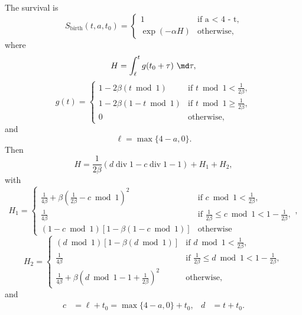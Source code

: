 \documentclass{jpmarticle}
\DeclareMathOperator{\dv}{div}
\begin{document}
The survival is
\begin{equation}
  S_{\mathrm{birth}}(t, a, t_0) =
  \begin{cases}
    1 & \text{if a < 4 - t},
    \\
    \exp(-\alpha H) & \text{otherwise},
  \end{cases}
\end{equation}
where
\begin{equation}
  H =
  \int_{\ell}^t g(t_0 + \tau)~\md \tau,
\end{equation}
\begin{equation}
  g (t) =
  \begin{cases}
    1 - 2 \beta (t \bmod 1)
    & \text{if $t \bmod 1 < \frac{1}{2 \beta}$},
    \\
    1 - 2 \beta (1 - t \bmod 1)
    & \text{if $t \bmod 1 \geq \frac{1}{2 \beta}$},
    \\
    0
    & \text{otherwise},
  \end{cases}
\end{equation}
and
\begin{equation}
  \ell = \max\{4 - a, 0\}.
\end{equation}
Then
\begin{equation}
  H =
  \frac{1}{2 \beta} \left(d \dv 1 - c \dv 1 - 1\right)
  + H_1  + H_2,
\end{equation}
with
\begin{equation}
  H_1 =
  \begin{cases}
    \frac{1}{4 \beta}
    + \beta \left(\frac{1}{2 \beta} - c \bmod 1\right)^2
    & \text{if $c \bmod 1 < \frac{1}{2 \beta}$},
    \\
    \frac{1}{4 \beta}
    & \text{if $\frac{1}{2 \beta} \leq c \bmod 1 < 1 - \frac{1}{2 \beta}$},
    \\
    \left(1 - c \bmod 1\right)
    \left[1 - \beta \left(1 - c \bmod 1\right)\right]
    & \text{otherwise}
  \end{cases},
\end{equation}
\begin{equation}
  H_2 =
  \begin{cases}
    (d \bmod 1) \left[1 - \beta (d \bmod 1)\right]
    & \text{if $d \bmod 1 < \frac{1}{2 \beta}$},
    \\
    \frac{1}{4 \beta}
    & \text{if $\frac{1}{2 \beta} \leq d \bmod 1 < 1 - \frac{1}{2 \beta}$},
    \\
    \frac{1}{4 \beta}
    + \beta \left(d \bmod 1 - 1 + \frac{1}{2 \beta}\right)^2
    & \text{otherwise},
    \end{cases}
\end{equation}
and
\begin{align}
  c &= \ell + t_0 = \max\{4 - a, 0\} + t_0,
  &
  d &= t + t_0.
\end{align}




\end{document}

